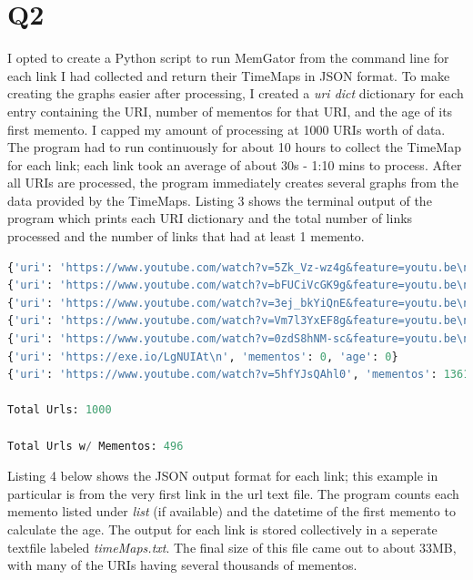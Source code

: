\documentclass[12pt]{article}
\begin{document}
\section*{Q2}
I opted to create a Python script to run MemGator from the command line for each link I had collected and return their TimeMaps in JSON format. To make creating the graphs easier after processing, I created a \emph{uri \textunderscore dict} dictionary for each entry containing the URI, number of mementos for that URI, and the age of its first memento. I capped my amount of processing at 1000 URIs worth of data. The program had to run continuously for about 10 hours to collect the TimeMap for each link; each link took an average of about 30s - 1:10 mins to process. After all URIs are processed, the program immediately creates several graphs from the data provided by the TimeMaps. Listing 3 shows the terminal output of the program which prints each URI dictionary and the total number of links processed and the number of links that had at least 1 memento.



\begin{lstlisting}[language=Python, caption=Terminal output after program execution, label=lst:copy]
{'uri': 'https://www.youtube.com/watch?v=5Zk_Vz-wz4g&feature=youtu.be\n', 'mementos': 0, 'age': 0}
{'uri': 'https://www.youtube.com/watch?v=bFUCiVcGK9g&feature=youtu.be\n', 'mementos': 1, 'age': 7}
{'uri': 'https://www.youtube.com/watch?v=3ej_bkYiQnE&feature=youtu.be\n', 'mementos': 0, 'age': 0}
{'uri': 'https://www.youtube.com/watch?v=Vm7l3YxEF8g&feature=youtu.be\n', 'mementos': 1, 'age': 2}
{'uri': 'https://www.youtube.com/watch?v=0zdS8hNM-sc&feature=youtu.be\n', 'mementos': 0, 'age': 0}
{'uri': 'https://exe.io/LgNUIAt\n', 'mementos': 0, 'age': 0}
{'uri': 'https://www.youtube.com/watch?v=5hfYJsQAhl0', 'mementos': 1361, 'age': 3871}

Total Urls: 1000

Total Urls w/ Mementos: 496
\end{lstlisting}

\par Listing 4 below shows the JSON output format for each link; this example in particular is from the very first link in the url text file. The program counts each memento listed under \emph{list} (if available) and the datetime of the first memento to calculate the age. The output for each link is stored collectively in a seperate textfile labeled \emph{timeMaps.txt}. The final size of this file came out to about 33MB, with many of the URIs having several thousands of mementos. 
\end{document}
